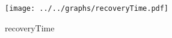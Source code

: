 \begin{figure}[h] \centering \texttt{[image: ../../graphs/recoveryTime.pdf]}\caption{recoveryTime}\label{gr:recoveryTime} \end{figure}
